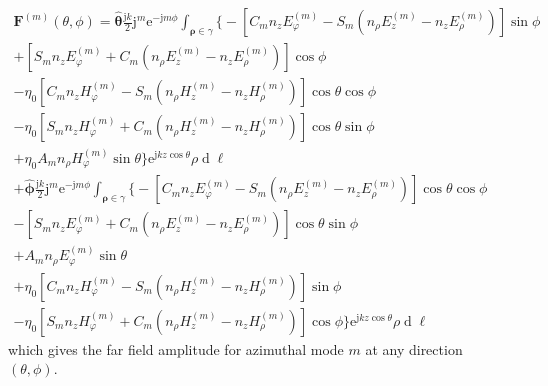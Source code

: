 \documentclass[a4paper,12pt]{article}
\renewcommand{\vec}[1]{\boldsymbol{#1}}
\newcommand{\unitvec}[1]{\hat{\vec{#1}}}
\newcommand{\mrm}[1]{\mathrm{#1}}
\newcommand{\diff}{\operatorname{d}\!}
\newcommand{\ju}{\mrm{j}}
\newcommand{\eu}{\mrm{e}}
\newcommand{\Fv}{\vec{F}}
\newcommand{\thetauv}{\unitvec{\theta}}
\newcommand{\phiuv}{\unitvec{\phi}}
\begin{document}
\begin{multline}
  \Fv^{(m)}(\theta,\phi) = \thetauv\frac{\ju k}{2}\ju^{m}\eu^{-\ju
    m\phi} \int_{\vec{\rho}\in\gamma} \Big\{ - \left[ C_{m}
    n_{z}E_{\varphi}^{(m)}
    - S_{m} (n_{\rho}E_{z}^{(m)} - n_{z}E_{\rho}^{(m)}) \right] \sin\phi \\
  + \left[ S_{m} n_{z}E_{\varphi}^{(m)}
    + C_{m} (n_{\rho}E_{z}^{(m)} - n_{z}E_{\rho}^{(m)}) \right] \cos\phi \\
  - \eta_{0} \left[ C_{m} n_{z}H_{\varphi}^{(m)}
    - S_{m} (n_{\rho}H_{z}^{(m)} - n_{z}H_{\rho}^{(m)}) \right] \cos\theta\cos\phi \\
  - \eta_{0}\left[ S_{m} n_{z}H_{\varphi}^{(m)}
    + C_{m} (n_{\rho}H_{z}^{(m)} - n_{z}H_{\rho}^{(m)}) \right] \cos\theta\sin\phi \\
  + \eta_{0} A_{m} n_{\rho}H_{\varphi}^{(m)}
  \sin\theta \Big\} \eu^{\ju kz\cos\theta} \rho\diff\ell \\
  + \phiuv \frac{\ju k}{2} \ju^{m}\eu^{-\ju
    m\phi}\int_{\vec{\rho}\in\gamma} \Big\{ - \left[ C_{m}
    n_{z}E_{\varphi}^{(m)}
    - S_{m} (n_{\rho}E_{z}^{(m)} - n_{z}E_{\rho}^{(m)}) \right] \cos\theta\cos\phi \\
  - \left[ S_{m} n_{z}E_{\varphi}^{(m)}
    + C_{m} (n_{\rho}E_{z}^{(m)} - n_{z}E_{\rho}^{(m)}) \right] \cos\theta\sin\phi \\
  + A_{m} n_{\rho}E_{\varphi}^{(m)} \sin\theta \\
  + \eta_{0} \left[ C_{m} n_{z}H_{\varphi}^{(m)}
    - S_{m} (n_{\rho}H_{z}^{(m)} - n_{z}H_{\rho}^{(m)}) \right] \sin\phi \\
  - \eta_{0}\left[ S_{m} n_{z}H_{\varphi}^{(m)} +
    C_{m} (n_{\rho}H_{z}^{(m)} -
    n_{z}H_{\rho}^{(m)}) \right] \cos\phi \Big\} \eu^{\ju kz\cos\theta}
  \rho\diff\ell \label{eq:arbitraryfull}
\end{multline}
which gives the far field amplitude for azimuthal mode $m$ at any
direction $(\theta,\phi)$.





\end{document}
